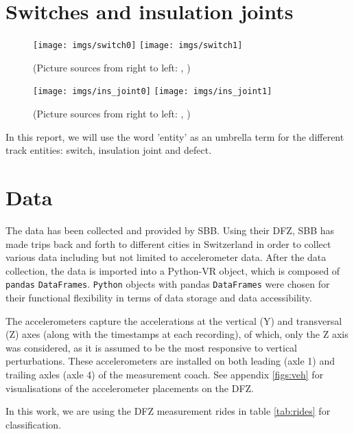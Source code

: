 \section{Switches and insulation joints}

\begin{figure}[H]
	\centering
	\texttt{[image: imgs/switch0]}
	\texttt{[image: imgs/switch1]}
	\caption{(Picture sources from right to left: \cite{swi0:online}, \cite{swi1:online})}
\end{figure}
\begin{figure}[H]
	\centering
	\texttt{[image: imgs/ins\_joint0]}
	\texttt{[image: imgs/ins\_joint1]}
	\caption{(Picture sources from right to left: \cite{ins0:online}, \cite{ins1:online})}
\end{figure}

In this report, we will use the word 'entity' as an umbrella term for the different track entities: switch, insulation joint and defect.

\section{Data}
The data has been collected and provided by SBB. Using their DFZ, SBB has made trips back and forth to different cities in Switzerland in order to collect various data including but not limited to accelerometer data. After the data collection, the data is imported into a Python-VR object, which is composed of \verb|pandas| \verb|DataFrames|. \verb|Python| objects with pandas \verb|DataFrames| were chosen for their functional flexibility in terms of data storage and data accessibility.

The accelerometers capture the accelerations at the vertical (Y) and transversal (Z) axes (along with the timestamps at each recording), of which, only the Z axis was considered, as it is assumed to be the most responsive to vertical perturbations. These accelerometers are installed on both leading (axle 1) and trailing axles (axle 4) of the measurement coach. See appendix \ref{figs:veh} for visualisations of the accelerometer placements on the DFZ. 

In this work, we are using the DFZ measurement rides in table \ref{tab:rides} for classification.

